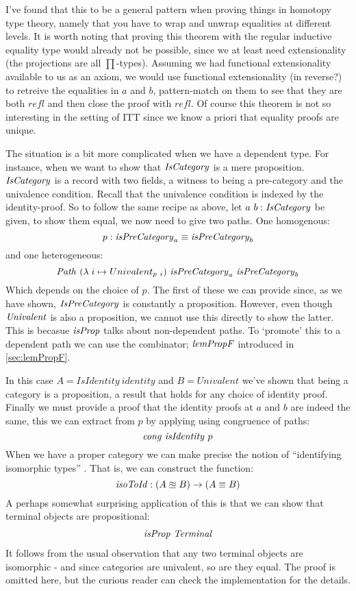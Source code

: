 %
I've found that this to be a general pattern when proving things in homotopy
type theory, namely that you have to wrap and unwrap equalities at different
levels. It is worth noting that proving this theorem with the regular inductive
equality type would already not be possible, since we at least need
extensionality (the projections are all $\prod$-types). Assuming we had
functional extensionality available to us as an axiom, we would use functional
extensionality (in reverse?) to retreive the equalities in $a$ and $b$,
pattern-match on them to see that they are both $\mathit{refl}$ and then close
the proof with $\mathit{refl}$. Of course this theorem is not so interesting in
the setting of ITT since we know a priori that equality proofs are unique.

The situation is a bit more complicated when we have a dependent type. For
instance, when we want to show that $\mathit{IsCategory}$ is a mere proposition.
$\mathit{IsCategory}$ is a record with two fields, a witness to being a pre-category and
the univalence condition. Recall that the univalence condition is indexed by the
identity-proof. So to follow the same recipe as above, let $a\ b \mathrel{:}
\mathit{IsCategory}$ be given, to show them equal, we now need to give two paths. One homogenous:
%
$$
p \mathrel{:} \mathit{isPreCategory}_a \equiv \mathit{isPreCategory}_b
$$
%
and one heterogeneous:
%
$$
\Path\ (\lambda\; i \mto Univalent_{p\ i})\ \isPreCategory_a\ \isPreCategory_b
$$
%
Which depends on the choice of $p$. The first of these we can provide since, as
we have shown, $\mathit{IsPreCategory}$ is constantly a proposition. However, even
though $\mathit{Univalent}$ is also a proposition, we cannot use this directly to show
the latter. This is becasue $\mathit{isProp}$ talks about non-dependent paths. To
`promote' this to a dependent path we can use the combinator; $\mathit{lemPropF}$
introduced in \ref{sec:lemPropF}.

In this case $A = \mathit{IsIdentity}\ \mathit{identity}$ and $B =
\mathit{Univalent}$ we've shown that being a category is a proposition, a result
that holds for any choice of identity proof. Finally we must provide a proof
that the identity proofs at $a$ and $b$ are indeed the same, this we can extract
from $p$ by applying using congruence of paths:
%
$$
\mathit{cong}\ \mathit{isIdentity}\ p
$$
%
When we have a proper category we can make precise the notion of ``identifying
isomorphic types'' . That is, we can construct the
function:
%
$$
\mathit{isoToId} \mathrel{:} (A \approxeq B) \to (A \equiv B)
$$
%
A perhaps somewhat surprising application of this is that we can show that
terminal objects are propositional:
%
\begin{align}
\label{eq:termProp}
\mathit{isProp}\ \mathit{Terminal}
\end{align}
%
It follows from the usual observation that any two terminal objects are
isomorphic - and since categories are univalent, so are they equal. The proof is
omitted here, but the curious reader can check the implementation for the
details. 

